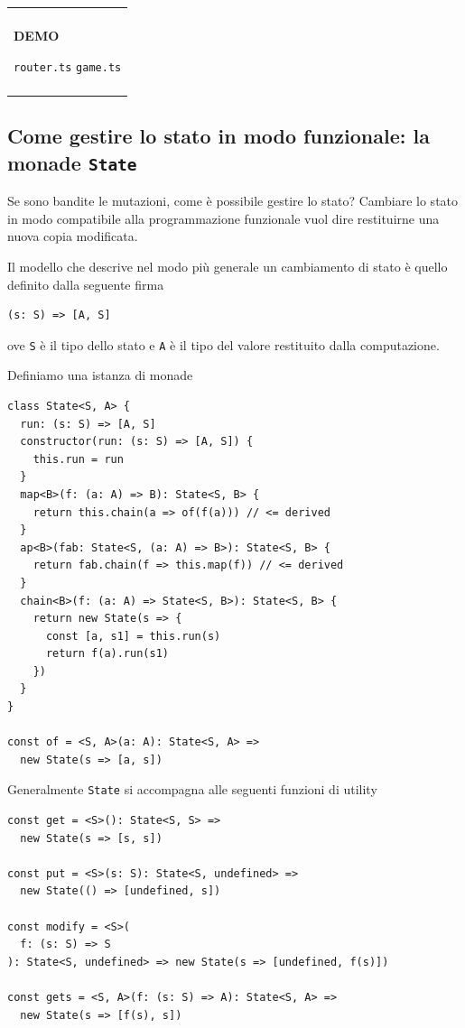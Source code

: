 \documentclass[12pt]{article}
\newenvironment{boxed}
    {\begin{center}
    \begin{tabular}{|p{0.9\textwidth}|}
    \hline\\
    }
    {
    \\\\\hline
    \end{tabular}
    \end{center}
    }
\begin{document}
\begin{boxed}
\begin{center}
\textbf{DEMO}

\texttt{router.ts}
\texttt{game.ts}
\end{center}
\end{boxed}

\subsection{Come gestire lo stato in modo funzionale: la monade \texttt{State}}

Se sono bandite le mutazioni, come è possibile gestire lo stato?
Cambiare lo stato in modo compatibile alla programmazione funzionale vuol dire restituirne una nuova copia modificata.

Il modello che descrive nel modo più generale un cambiamento di stato è quello definito dalla seguente firma

\begin{verbatim}
(s: S) => [A, S]
\end{verbatim}

ove \texttt{S} è il tipo dello stato e \texttt{A} è il tipo del valore restituito dalla computazione.

Definiamo una istanza di monade

\begin{verbatim}
class State<S, A> {
  run: (s: S) => [A, S]
  constructor(run: (s: S) => [A, S]) {
    this.run = run
  }
  map<B>(f: (a: A) => B): State<S, B> {
    return this.chain(a => of(f(a))) // <= derived
  }
  ap<B>(fab: State<S, (a: A) => B>): State<S, B> {
    return fab.chain(f => this.map(f)) // <= derived
  }
  chain<B>(f: (a: A) => State<S, B>): State<S, B> {
    return new State(s => {
      const [a, s1] = this.run(s)
      return f(a).run(s1)
    })
  }
}

const of = <S, A>(a: A): State<S, A> =>
  new State(s => [a, s])
\end{verbatim}

Generalmente \texttt{State} si accompagna alle seguenti funzioni di utility

\begin{verbatim}
const get = <S>(): State<S, S> =>
  new State(s => [s, s])

const put = <S>(s: S): State<S, undefined> =>
  new State(() => [undefined, s])

const modify = <S>(
  f: (s: S) => S
): State<S, undefined> => new State(s => [undefined, f(s)])

const gets = <S, A>(f: (s: S) => A): State<S, A> =>
  new State(s => [f(s), s])
\end{verbatim}
\end{document}
